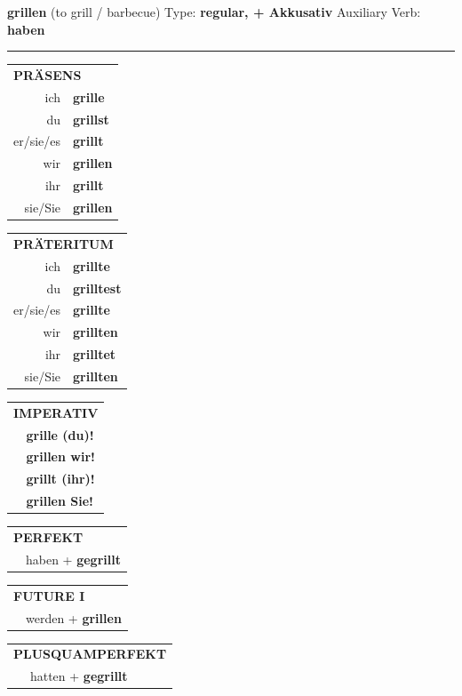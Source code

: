 \documentclass[10pt,a4paper]{revtex4-2}
\begin{document}
\begin{verbbox-acc}
{\Large \bf grillen} (to grill / barbecue) \hfill Type: \textbf{regular, + Akkusativ} \hfill Auxiliary Verb: \textbf{haben}

\vspace{5pt}
\hrule
\vspace{5pt}

\begin{tabular}{rl}
\multicolumn{2}{l}{\textbf{PRÄSENS}}\\
ich & \textbf{grille}\\
du & \textbf{grillst}\\
er/sie/es & \textbf{grillt}\\
wir & \textbf{grillen}\\
ihr & \textbf{grillt}\\
sie/Sie & \textbf{grillen}\\
\end{tabular}
\hfill
\begin{tabular}{rl}
\multicolumn{2}{l}{\textbf{PRÄTERITUM}}\\
ich & \textbf{grillte}\\
du & \textbf{grilltest}\\
er/sie/es & \textbf{grillte}\\
wir & \textbf{grillten}\\
ihr & \textbf{grilltet}\\
sie/Sie & \textbf{grillten}\\
\end{tabular}
\hfill
\begin{tabular}{rl}
\multicolumn{2}{l}{\textbf{IMPERATIV}}\\
& \textbf{grille (du)!}\\
& \textbf{grillen wir!}\\
& \textbf{grillt (ihr)!}\\
& \textbf{grillen Sie!}\\
\end{tabular}

\vspace{10pt}

\begin{tabular}{rl}
\multicolumn{2}{l}{\textbf{PERFEKT}}\\
& haben + \textbf{gegrillt}\\
\end{tabular}
\hfill
\begin{tabular}{rl}
\multicolumn{2}{l}{\textbf{FUTURE I}}\\
& werden + \textbf{grillen}\\
\end{tabular}
\hfill
\begin{tabular}{rl}
\multicolumn{2}{l}{\textbf{PLUSQUAMPERFEKT}}\\
& hatten + \textbf{gegrillt}\\
\end{tabular}


\end{verbbox-acc}
\end{document}
